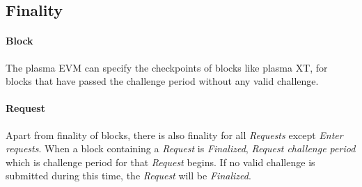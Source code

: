 \documentclass[letterpaper, 11pt]{article}
\begin{document}
\subsection{Finality}
\begin{CJK}{UTF8}{mj}
\paragraph{Block}
The plasma EVM can specify the checkpoints of blocks like plasma XT, for blocks that have passed the challenge period without any valid challenge.

\paragraph{Request}
Apart from finality of blocks, there is also finality for all \emph{Requests} except \emph{Enter requests}. When a block containing a \emph{Request} is \emph{Finalized}, \emph{Request challenge period} which is challenge period for that \emph{Request} begins. If no valid challenge is submitted during this time, the \emph{Request} will be \emph{Finalized}.
\end{CJK}

\end{document}
